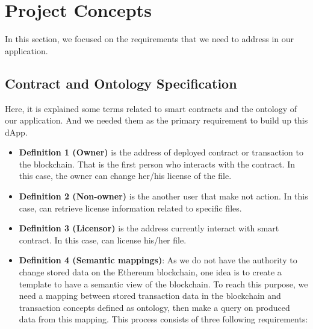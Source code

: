 \section{Project Concepts}

In this section, we focused on the requirements that we need to address in our application.
\\
\subsection{Contract and Ontology Specification}
Here, it is explained some terms related to smart contracts and the ontology of our application. And we needed them as the primary requirement to build up this dApp.
\begin{itemize}
	\item \textbf{Definition 1 (Owner)} is the address of deployed contract or transaction to the blockchain. That is the first person who interacts with the contract. In this case, the owner can change her/his license of the file.\\
	\item \textbf{Definition 2 (Non-owner)} is the another user that make not action. In this case, can retrieve license information related to specific files.\\
	\item \textbf{Definition 3 (Licensor)} is the address currently interact with smart contract. In this case, can license his/her file.\\ 
	\item \textbf{Definition 4 (Semantic mappings)}: As we do not have the authority to change stored data on the Ethereum blockchain, one idea is to create a template to have a semantic view of the blockchain.
	To reach this purpose, we need a mapping between stored transaction data in the blockchain and transaction concepts defined as ontology, then make a query on produced data from this mapping. This process consists of three following requirements:
	

\end{itemize}
